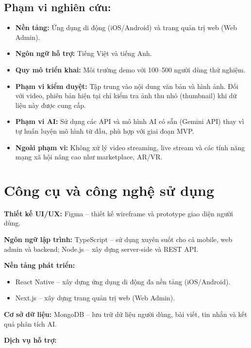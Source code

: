 \subsection{Phạm vi nghiên
cứu:}\label{phux1ea1m-vi-nghiuxean-cux1ee9u}

\begin{itemize}
\item
  \textbf{Nền tảng:} Ứng dụng di động (iOS/Android) và trang quản trị
  web (Web Admin).
\item
  \textbf{Ngôn ngữ hỗ trợ:} Tiếng Việt và tiếng Anh.
\item
  \textbf{Quy mô triển khai:} Môi trường demo với 100--500 người dùng
  thử nghiệm.
\item
  \textbf{Phạm vi kiểm duyệt:} Tập trung vào nội dung văn bản và hình
  ảnh. Đối với video, phiên bản hiện tại chỉ kiểm tra ảnh thu nhỏ
  (thumbnail) khi dữ liệu này được cung cấp.
\item
  \textbf{Phạm vi AI:} Sử dụng các API và mô hình AI có sẵn (Gemini API)
  thay vì tự huấn luyện mô hình từ đầu, phù hợp với giai đoạn MVP.
\item
  \textbf{Ngoài phạm vi:} Không xử lý video streaming, live stream và
  các tính năng mạng xã hội nâng cao như marketplace, AR/VR.
\end{itemize}

\section{Công cụ và công nghệ sử
dụng}\label{cuxf4ng-cux1ee5-vuxe0-cuxf4ng-nghux1ec7-sux1eed-dux1ee5ng}

\textbf{Thiết kế UI/UX:} Figma -- thiết kế wireframe và prototype giao
diện người dùng.

\textbf{Ngôn ngữ lập trình:} TypeScript -- sử dụng xuyên suốt cho cả
mobile, web admin và backend; Node.js -- xây dựng server-side và REST
API.

\textbf{Nền tảng phát triển:}

\begin{itemize}
\item
  React Native -- xây dựng ứng dụng di động đa nền tảng (iOS/Android).
\item
  Next.js -- xây dựng trang quản trị web (Web Admin).
\end{itemize}

\textbf{Cơ sở dữ liệu:} MongoDB -- lưu trữ dữ liệu người dùng, bài viết,
tin nhắn và kết quả phân tích AI.

\textbf{Dịch vụ hỗ trợ:}

